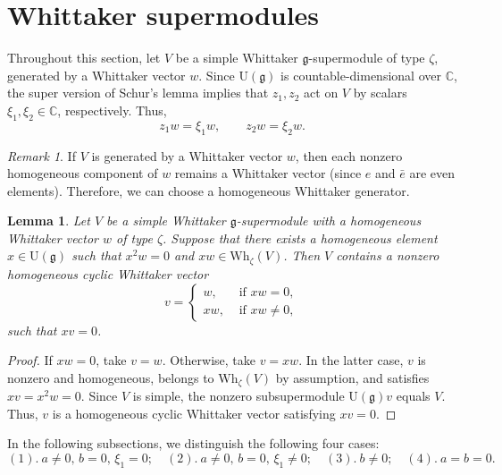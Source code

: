 \documentclass[a4paper,10pt]{article}
\theoremstyle{definition}
\theoremstyle{plain}
\newtheorem{lemma}[definition]{Lemma}
\theoremstyle{remark}
\newtheorem{remark}[definition]{Remark}
\theoremstyle{mystyle}
\numberwithin{equation}{section}
\begin{document}
\section{Whittaker supermodules}\label{s3}
Throughout this section, let $V$ be a simple Whittaker $\mathfrak g$-supermodule of type $\zeta$, generated by a Whittaker vector $w$. Since $\mathrm U(\mathfrak g)$ is countable-dimensional over $\mathbb C$, the super version of Schur's lemma implies that $z_1,z_2$ act on $V$ by scalars $\xi_1,\xi_2\in \mathbb C$, respectively. Thus,
\begin{equation}\label{ca}
    z_1w=\xi_1w,\qquad z_2w=\xi_2w.
\end{equation}
\begin{remark}
    If $V$ is generated by a Whittaker vector $w$, then each nonzero homogeneous component of $w$ remains a Whittaker vector (since $e$ and $\bar e$ are even elements). Therefore, we can choose a homogeneous Whittaker generator.
\end{remark}
\begin{lemma}\label{cons}
    Let $V$ be a simple Whittaker $\mathfrak g$-supermodule with a homogeneous Whittaker vector $w$ of type $\zeta$. Suppose that there exists a homogeneous element $x\in \mathrm U(\mathfrak g)$ such that $x^2w=0$ and $xw\in \mathrm{Wh}_{\zeta}(V)$. Then $V$ contains a nonzero homogeneous cyclic Whittaker vector 
    \begin{equation}\label{nv}
        v=
    \begin{cases}
    w, &\text{ if } xw=0,\\
    xw,    &\text{ if } xw\neq0,

    \end{cases}
    \end{equation}
such that $xv=0$.
\end{lemma}
\begin{proof}
    If $xw=0$, take $v=w$. Otherwise, take $v=xw$. In the latter case, $v$ is nonzero and homogeneous, belongs to $\mathrm{Wh}_{\zeta}(V)$ by assumption, and satisfies $xv=x^2w=0$. Since $V$ is simple, the nonzero subsupermodule $\mathrm U(\mathfrak g)v$ equals $V$. Thus, \(v\) is a homogeneous cyclic Whittaker vector satisfying $xv=0$.
\end{proof}

In the following subsections, we distinguish the following four cases: 
$$(1).\ a\neq0,\,b=0,\,\xi_1=0;\quad (2).\ a\neq 0,\,b=0,\,\xi_1\neq 0;\quad (3).\ b\neq 0;\quad (4).\ a=b=0.$$
\end{document}

